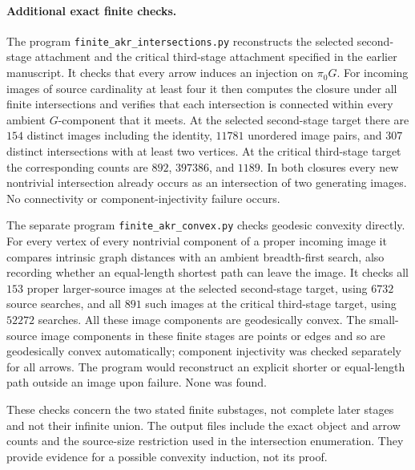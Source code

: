 \paragraph{Additional exact finite checks.}
The program \texttt{finite\_akr\_intersections.py} reconstructs
the selected second-stage attachment and the critical third-stage
attachment specified in the earlier manuscript. It checks that
every arrow induces an injection on $\pi_0G$. For incoming images
of source cardinality at least four it then computes the closure
under all finite intersections and verifies that each intersection
is connected within every ambient $G$-component that it meets.
At the selected second-stage target there are $154$ distinct images
including the identity, $11781$ unordered image pairs, and $307$
distinct intersections with at least two vertices. At the critical
third-stage target the corresponding counts are $892$, $397386$,
and $1189$. In both closures every new nontrivial intersection
already occurs as an intersection of two generating images.
No connectivity or component-injectivity failure occurs.

The separate program \texttt{finite\_akr\_convex.py} checks
geodesic convexity directly. For every vertex of every nontrivial
component of a proper incoming image it compares intrinsic graph
distances with an ambient breadth-first search, also recording
whether an equal-length shortest path can leave the image. It
checks all $153$ proper larger-source images at the selected
second-stage target, using $6732$ source searches, and all $891$
such images at the critical third-stage target, using $52272$
searches. All these image components are geodesically convex.
The small-source image components in these finite stages are
points or edges and so are geodesically convex automatically;
component injectivity was checked separately for all arrows.
The program would reconstruct an explicit shorter or equal-length
path outside an image upon failure. None was found.

These checks concern the two stated finite substages, not complete
later stages and not their infinite union. The output files include
the exact object and arrow counts and the source-size restriction
used in the intersection enumeration. They provide evidence for
a possible convexity induction, not its proof.

